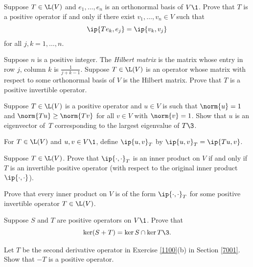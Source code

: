 \exercise
Suppose $T \in \L(V)$ and $e_1, \ldots, e_n$ is an orthonormal basis of $V\1$. Prove that $T$ is a positive operator if and only if there exist
$v_1, \ldots, v_n \in V$ such that
\[
\ip{Te_k, e_j} = \ip{v_k, v_j}
\]
for all $j, k = 1, \ldots, n$.\label{Grammian}


\exercise
Suppose $n$ is a positive integer. The  \emph{Hilbert matrix} is the  matrix whose entry in row $j$, column $k$ is
$\frac{1}{j+k-1}$. Suppose $T \in \L(V)$ is an operator whose matrix with respect to some orthonormal basis of $V$ is the  Hilbert matrix. Prove that $T$ is a positive invertible operator.
\vspace{-6bp}


\exercise
Suppose $T \in \L(V)$ is a positive operator and $u \in V$ is such that $\norm{u} = 1$ and $\norm{Tu} \ge \norm{Tv}$ for all $v \in V$ with $\norm{v} = 1$. Show that $u$ is an eigenvector of~$T$ corresponding to the largest eigenvalue of $T\3$.


\exercise
For $T \in \L(V)$ and $u, v \in V\1$, define $\ip{u, v}_T$ by
$
\ip{u, v}_T = \ip{Tu, v}$.
\begin{subtheorem}
\item
Suppose $T \in \L(V)$. Prove that $\ip{\cdot, \cdot}_T$ is an inner product on $V$ if and only if $T$ is an invertible positive operator (with respect to the original inner product $\ip{\cdot, \cdot}$).
\item
Prove that every inner product on $V$ is of the form $\ip{\cdot, \cdot}_T$ for some positive invertible operator $T \in \L(V)$.
\end{subtheorem}
\exercisesubtheoremend


\exercise
Suppose $S$ and $T$ are positive operators on $V\1$. Prove that
\[
\ker(S+T) = \ker S \cap \ker T\3.
\]
\exercisedisplayend


\exercise
Let $T$ be the second derivative operator in Exercise \ref{1100}(b) in Section \ref{7001}. Show that $-T$ is a positive operator.


